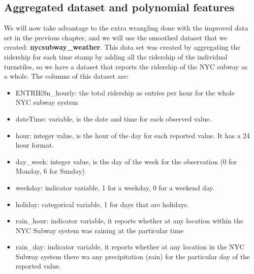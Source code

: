 \documentclass[a4paper,12pt,english]{sphinxmanual}
\begin{document}
\subsection{Aggregated dataset and polynomial features}
\label{section2:aggregated-dataset-and-polynomial-features}
We will now take advantage to the extra wrangling done with the improved data
set in the previous chapter, and we will use the smoothed dataset that we
created: \textbf{nycsubway\_weather}. This data set was created by aggregating the
ridership for each time stamp by adding all the ridership of the individual
turnstiles, so we have a dataset that reports the ridership of the NYC subway as
a whole. The columns of this dataset are:
\begin{itemize}
\item {} 
ENTRIESn\_hourly: the total ridership as entries per hour for the whole NYC
subway system

\item {} 
dateTime:  variable, is the date and time for each observed value.

\item {} 
hour: integer value, is the hour of the day for each reported value. It has a
24 hour format.

\item {} 
day\_week: integer value, is the day of the week for the observation (0 for
Monday, 6 for Sunday)

\item {} 
weekday: indicator variable, 1 for a weekday, 0 for a weekend day.

\item {} 
holiday: categorical variable, 1 for days that are holidays.

\item {} 
rain\_hour: indicator variable, it reports whether at any location within the
NYC Subway system was raining at the particular time

\item {} 
rain\_day: indicator variable, it reports whether at any location in the NYC
Subway system there wa any precipitation (rain) for the particular day of the
reported value.

\end{itemize}
\end{document}
